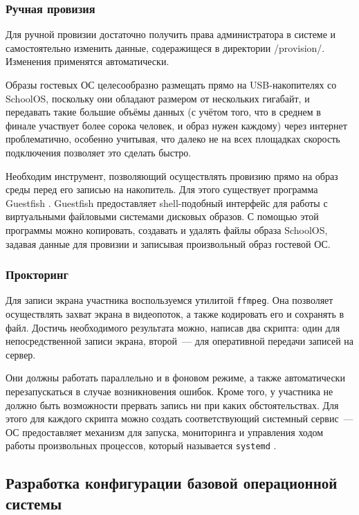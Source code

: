 \subsubsection{Ручная провизия}

Для ручной провизии достаточно получить права администратора в системе и самостоятельно изменить данные, содеражищеся в директории /provision/. Изменения применятся автоматически.

Образы гостевых ОС целесообразно размещать прямо на USB-накопителях со SchoolOS, поскольку они обладают размером от нескольких гигабайт, и передавать такие большие объёмы данных (с учётом того, что в среднем в финале участвует более сорока человек, и образ нужен каждому) через интернет проблематично, особенно учитывая, что далеко не на всех площадках скорость подключения позволяет это сделать быстро.

Необходим инструмент, позволяющий осуществлять провизию прямо на образ среды перед его записью на накопитель. Для этого существует программа Guestfish \cite{Guestfish}. Guestfish предоставляет shell-подобный интерфейс для работы с виртуальными файловыми системами дисковых образов. С помощью этой программы можно копировать, создавать и удалять файлы образа SchoolOS, задавая данные для провизии и записывая произвольный образ гостевой ОС.

\subsubsection{Прокторинг}

Для записи экрана участника воспользуемся утилитой \texttt{ffmpeg}. Она позволяет осуществлять захват экрана в видеопоток, а также кодировать его и сохранять в файл. Достичь необходимого результата можно, написав два скрипта: один для непосредственной записи экрана, второй~--- для оперативной передачи записей на сервер.

Они должны работать параллельно и в фоновом режиме, а также автоматически перезапускаться в случае возникновения ошибок. Кроме того, у участника не должно быть возможности прервать запись ни при каких обстоятельствах. Для этого для каждого скрипта можно создать соответствующий системный сервис~--- ОС предоставляет механизм для запуска, мониторинга и управления ходом работы произвольных процессов, который называется \texttt{systemd} \cite{Systemd}.

\subsection{Разработка конфигурации базовой операционной системы}


